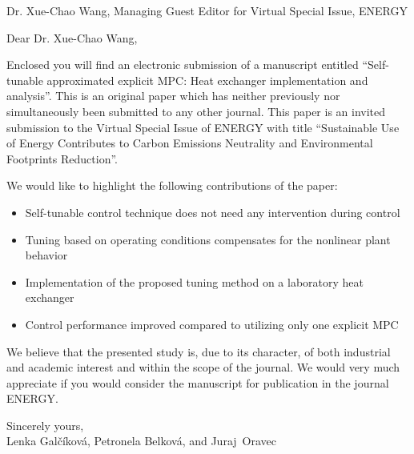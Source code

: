 \documentclass[a4paper,10pt]{letter}
\begin{document}
\pagestyle{headings}
\begin{letter}{Dr. Xue-Chao Wang, Managing Guest Editor for Virtual Special Issue, ENERGY}

\opening{Dear Dr. Xue-Chao Wang,}

Enclosed you will find an electronic submission of a manuscript entitled ``Self-tunable approximated explicit MPC: Heat exchanger implementation and analysis''. 
This is an original paper which has neither previously nor simultaneously been submitted to any other journal. This paper is an invited submission to the Virtual Special Issue of ENERGY with title ``Sustainable Use of Energy Contributes to Carbon Emissions Neutrality and Environmental Footprints Reduction''.

We would like to highlight the following contributions of the paper:
\begin{itemize}
	\item Self-tunable control technique does not need any intervention during control
	\item Tuning based on operating conditions compensates for the nonlinear plant behavior
	\item Implementation of the proposed tuning method on a laboratory heat exchanger 
	\item Control performance improved compared to utilizing only one explicit MPC
\end{itemize}

We believe that the presented study is, due to its character, of both industrial and academic interest and within the scope of the journal. We would very much appreciate if you would consider the manuscript for publication in the journal ENERGY.

Sincerely yours, \\
Lenka Gal\v{c}\'{i}kov\'{a}, Petronela Belkov\'{a}, and Juraj~Oravec

\end{letter}
\end{document}
